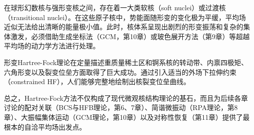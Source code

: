 在球形幻数核与强形变核之间，存在着一大类软核（soft nuclei）或过渡核（transitional nuclei）。在这些原子核中，势能面随形变的变化极为平缓，平均场近似无法给出清晰的能量极小值。此时，核体系呈现出剧烈的形变振荡和复杂的集体激发，必须借助生成坐标法（GCM，第10章）或玻色展开方法（第9章）等超越平均场的动力学方法进行处理。

形变Hartree-Fock理论在定量描述重质量稀土区和锕系核的转动带、内禀四极矩、六角形变以及裂变位垒方面取得了巨大成功。通过引入适当的外场下拉伸约束（constrained
HF），人们能够完整地绘制出核裂变位垒曲线\cite{FQ73,FQS73}。

总之，Hartree-Fock方法不仅构成了现代微观核结构理论的基石，而且为后续各章讨论的配对关联（BCS与HFB理论，第6、7章）、简谐微振动（RPA理论，第8章）、大振幅集体运动（GCM理论，第10章）以及对称性恢复（第11章）提供了最根本的自洽平均场出发点。
